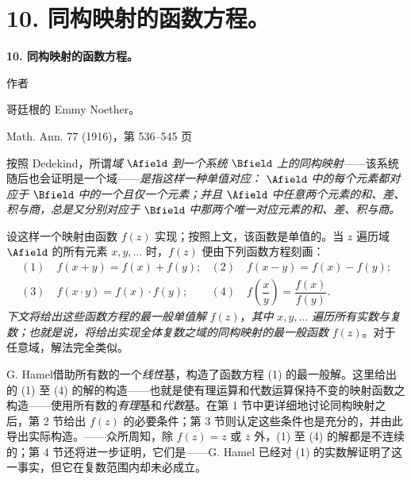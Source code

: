 \section*{10. 同构映射的函数方程。}
\begin{center}
{\Large\bfseries 10. 同构映射的函数方程。}\par
\vspace{0.75em}
作者\par
\vspace{0.75em}
哥廷根的 Emmy Noether。\par
\vspace{1em}
Math. Ann. 77 (1916)，第 536--545 页
\end{center}

\vspace{3em}

按照 Dedekind，所谓\emph{域} \(\Afield\) \emph{到一个系统} \(\Bfield\) \emph{上的同构映射}——该系统随后也会证明是一个域——\emph{是指这样一种单值对应：} \(\Afield\) \emph{中的每个元素都对应于} \(\Bfield\) \emph{中的一个且仅一个元素；并且} \(\Afield\) \emph{中任意两个元素的和、差、积与商，总是又分别对应于} \(\Bfield\) \emph{中那两个唯一对应元素的和、差、积与商。}

设这样一个映射由函数 \(f(z)\) 实现；按照上文，该函数是单值的。当 \(z\) 遍历域 \(\Afield\) 的所有元素 \(x,y,\ldots\) 时，\(f(z)\) 便由下列函数方程刻画：
\[
\begin{array}{ll}
(1)\quad f(x+y)=f(x)+f(y); & (2)\quad f(x-y)=f(x)-f(y);\\[0.45em]
(3)\quad f(x\cdot y)=f(x)\cdot f(y); & (4)\quad f\!\left(\dfrac{x}{y}\right)=\dfrac{f(x)}{f(y)}.
\end{array}
\]
\emph{下文将给出这些函数方程的最一般单值解} \(f(z)\)，\emph{其中} \(x,y,\ldots\) \emph{遍历所有实数与复数；也就是说，将给出实现全体复数之域的同构映射的最一般函数} \(f(z)\)。对于任意域，解法完全类似。

G. Hamel借助所有数的一个\emph{线性}基，构造了函数方程 (1) 的最一般解。这里给出的 (1) 至 (4) 的解的构造——也就是使有理运算和代数运算保持不变的映射函数之构造——使用所有数的\emph{有理}基和\emph{代数}基。在第 1 节中更详细地讨论同构映射之后，第 2 节给出 \(f(z)\) 的必要条件；第 3 节则认定这些条件也是充分的，并由此导出实际构造。——众所周知，除 \(f(z)=z\) 或 \(\overline z\) 外，(1) 至 (4) 的解都是不连续的；第 4 节还将进一步证明，它们是——G. Hamel 已经对 (1) 的实数解证明了这一事实，但它在复数范围内却未必成立。

